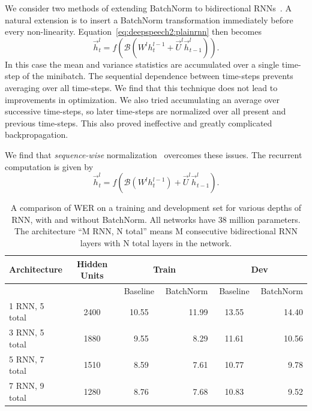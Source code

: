 We consider two methods of extending BatchNorm to bidirectional
RNNs~\cite{laurent2016}. A natural extension is to insert a BatchNorm
transformation immediately before every non-linearity.
Equation~\ref{eq:deepspeech2:plainrnn} then becomes 
\begin{equation*}
    \overrightarrow{h}^l_t =
        f( \mathcal{B}( W^l h^{l-1}_t + \overrightarrow{U}^l \overrightarrow{h}^l_{t-1} )).  
\end{equation*}
In this case the mean and variance statistics are accumulated over a single
time-step of the minibatch. The sequential dependence between time-steps
prevents averaging over all time-steps. We find that this technique does not
lead to improvements in optimization. We also tried accumulating an average
over successive time-steps, so later time-steps are normalized over all present
and previous time-steps. This also proved ineffective and greatly complicated
backpropagation.

We find that \emph{sequence-wise} normalization~\cite{laurent2016} overcomes
these issues. The recurrent computation is given by
\begin{equation*}
    \overrightarrow{h}^l_t = f( \mathcal{B}( W^l h^{l-1}_t) + \overrightarrow{U}^l \overrightarrow{h}^l_{t-1}).  
\end{equation*}

\begin{table}
\centering
\begin{small}
\begin{tabular}{l  c  r r r  r  r r r  r}
\toprule
Architecture & Hidden Units & \multicolumn{4}{c}{Train} & \multicolumn{4}{c}{Dev}  \\
\midrule
     &  & \multicolumn{3}{c}{Baseline} & BatchNorm & \multicolumn{3}{c}{Baseline} & BatchNorm \\
\midrule
1 RNN, 5 total   & 2400 & & 10.55 & & 11.99 & & 13.55 & & 14.40 \\
3 RNN, 5 total   & 1880 & & 9.55  & & 8.29  & & 11.61 & & 10.56 \\
5 RNN, 7 total   & 1510 & & 8.59  & & 7.61  & & 10.77 & & 9.78 \\
7 RNN, 9 total   & 1280 & & 8.76  & & 7.68  & & 10.83 & & 9.52 \\
\bottomrule
\end{tabular}
\end{small}
\caption{A comparison of WER on a training and development set for various
    depths of RNN, with and without BatchNorm. All networks have 38 million
    parameters. The architecture ``M RNN, N total'' means M consecutive
    bidirectional RNN layers with N total layers in the network.}
\label{table:deepspeech2:batch_norm}
\end{table}

